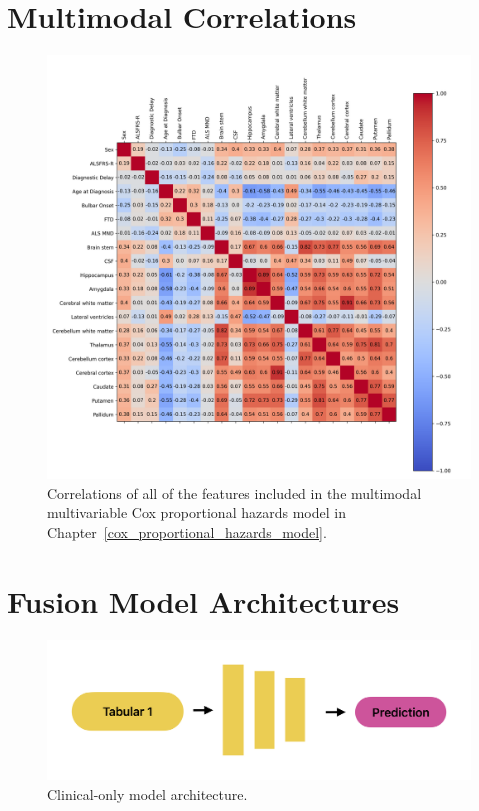 
 \appendix
\chapter{Multimodal Correlations}
\begin{figure}
    \centering
    \includegraphics[width=\textwidth]{figures/multimodal_correlation}
    \caption{Correlations of all of the features included in the multimodal multivariable Cox proportional hazards model in Chapter~\ref{cox_proportional_hazards_model}.}
    \label{fig:multimodalcorrelations}
\end{figure}

\chapter{Fusion Model Architectures}
\label{appendix:fusion_model_architectures}

\begin{figure}[h]
    \centering
    \includegraphics[width=0.8\linewidth]{figures//diagrams/Tabular1Unimodal}
    \caption{Clinical-only model architecture.}
    \label{fig:tabular1}
\end{figure}

